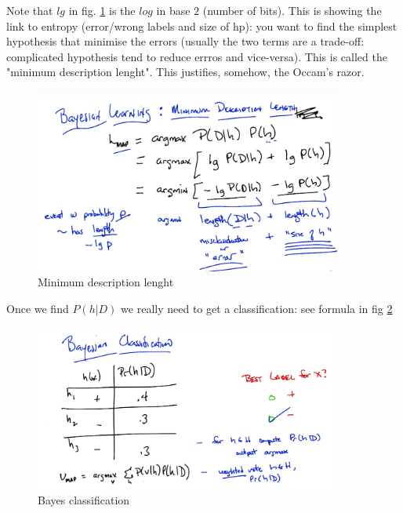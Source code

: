 \documentclass[11pt]{article}
\begin{document}
Note that $lg$ in fig. \ref{bayesian_learning3} is the $log$ in base $2$ (number of bits). This is showing the link to entropy (error/wrong labels and size of hp): you want to find the simplest hypothesis that minimise the errors (usually the two terms are a trade-off: complicated hypothesis tend to reduce errros and vice-versa). This is called the "minimum description lenght". This justifies, somehow, the Occam's razor.
\begin{figure}[htbp] 
	\centering
	\includegraphics[width=0.9\textwidth]{pics/bayesian_learning_3}
	\caption{Minimum description lenght} 
	\label{bayesian_learning3}
\end{figure}

Once we find $P(h|D)$ we really need to get a classification: see formula in fig \ref{bayesian_learning4} 
\begin{figure}[htbp] 
	\centering
	\includegraphics[width=0.9\textwidth]{pics/bayesian_learning_4}
	\caption{Bayes classification} 
	\label{bayesian_learning4}
\end{figure}
\end{document}
